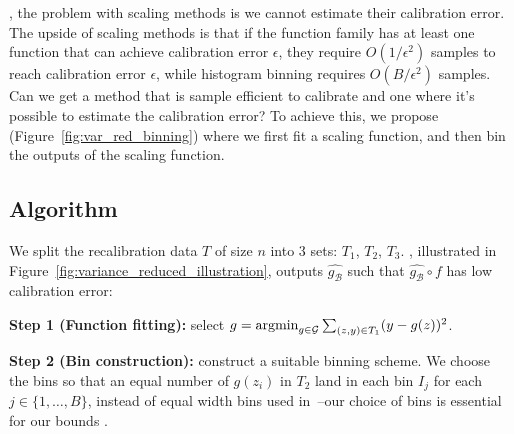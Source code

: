 \section{\Ourcal{}}
\label{sec:calibrating_models}

 , the problem with scaling methods is we cannot estimate their calibration error. The upside of scaling methods is that if the function family  has at least one function that can achieve calibration error $\epsilon$, they require $O(1/\epsilon^2)$ samples to reach calibration error $\epsilon$, while histogram binning requires $O(B/\epsilon^2)$ samples. Can we get  a method that is sample efficient to calibrate and one where it's possible to estimate the calibration error?
To achieve this, we propose \ourcal{} (Figure~\ref{fig:var_red_binning}) where we first fit a scaling function, and then bin the outputs of the scaling function.

\subsection{Algorithm}

We split the recalibration data $T$ of size $n$ into 3 sets: $T_1$, $T_2$, $T_3$. \Ourcal{}, illustrated in Figure~\ref{fig:variance_reduced_illustration}, outputs $\hat{g_{\mathcal{B}}}$ such that $\hat{g_{\mathcal{B}}} \circ f$ has low calibration error:

\textbf{Step 1 (Function fitting):}  select $g = \mathop{\mbox{argmin}}_{g \in \mathcal{G}} \sum_{(z, y) \in T_1} (y - g(z))^2$.

\textbf{Step 2 (Bin construction):}  construct a suitable binning scheme. We choose the bins so that an equal number of $g(z_i)$ in $T_2$  land in each bin $I_j$ for each $j \in \{1, \dots, B\}$, instead of equal width bins used in~\cite{guo2017calibration}--our choice of bins  is essential for our bounds .


